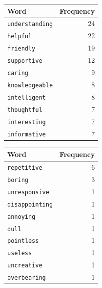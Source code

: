 \begin{table}[!htpb]
\centering
    \begin{tabular}{lr}
        \toprule
        \textbf{Word} & \textbf{Frequency} \\
        \toprule
        \texttt{understanding} & 24 \\
        \texttt{helpful} & 22 \\
        \texttt{friendly} & 19 \\
        \texttt{supportive} & 12 \\
        \texttt{caring} & 9 \\
        \texttt{knowledgeable} & 8 \\
        \texttt{intelligent} & 8 \\
        \texttt{thoughtful} & 7 \\
        \texttt{interesting} & 7 \\
        \texttt{informative} & 7 \\
        \midrule
        \bottomrule
        
    \end{tabular}
    \label{tab:top10pos}
    
\end{table}

\vspace{1em}

\begin{table}[!htpb]
\centering
    \begin{tabular}{lr}
        \toprule
        \textbf{Word} & \textbf{Frequency} \\
        \toprule
        \texttt{repetitive} & 6 \\
        \texttt{boring} & 3 \\
        \texttt{unresponsive} & 1 \\
        \texttt{disappointing} & 1 \\
        \texttt{annoying} & 1 \\
        \texttt{dull} & 1 \\
        \texttt{pointless} & 1 \\
        \texttt{useless} & 1 \\
        \texttt{uncreative} & 1 \\
        \texttt{overbearing} & 1 \\
        \midrule
        \bottomrule
    \end{tabular}
    \label{tab:top10neg}
    
\end{table}



